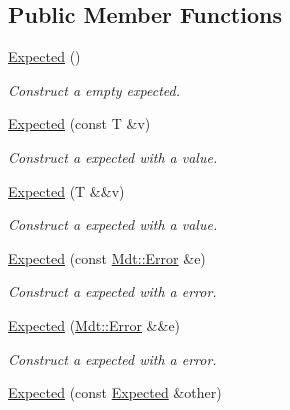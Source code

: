 \subsection*{Public Member Functions}
\begin{DoxyCompactItemize}
\item 
\hyperlink{class_mdt_1_1_expected_ab271cafc564b8dba7c5737a8e6f78a8d}{Expected} ()
\begin{DoxyCompactList}\small\item\em Construct a empty expected. \end{DoxyCompactList}\item 
\hyperlink{class_mdt_1_1_expected_a5046d26152b32d7184d756f00325cd60}{Expected} (const T \&v)\hypertarget{class_mdt_1_1_expected_a5046d26152b32d7184d756f00325cd60}{}\label{class_mdt_1_1_expected_a5046d26152b32d7184d756f00325cd60}

\begin{DoxyCompactList}\small\item\em Construct a expected with a value. \end{DoxyCompactList}\item 
\hyperlink{class_mdt_1_1_expected_abf1fd00a7d5508ab2030f729105de12f}{Expected} (T \&\&v)\hypertarget{class_mdt_1_1_expected_abf1fd00a7d5508ab2030f729105de12f}{}\label{class_mdt_1_1_expected_abf1fd00a7d5508ab2030f729105de12f}

\begin{DoxyCompactList}\small\item\em Construct a expected with a value. \end{DoxyCompactList}\item 
\hyperlink{class_mdt_1_1_expected_a98be29378d9ee4d855b041c5a347d967}{Expected} (const \hyperlink{class_mdt_1_1_error}{Mdt\+::\+Error} \&e)\hypertarget{class_mdt_1_1_expected_a98be29378d9ee4d855b041c5a347d967}{}\label{class_mdt_1_1_expected_a98be29378d9ee4d855b041c5a347d967}

\begin{DoxyCompactList}\small\item\em Construct a expected with a error. \end{DoxyCompactList}\item 
\hyperlink{class_mdt_1_1_expected_a63cf8d36dfb4657d39fcfb614f575ab4}{Expected} (\hyperlink{class_mdt_1_1_error}{Mdt\+::\+Error} \&\&e)\hypertarget{class_mdt_1_1_expected_a63cf8d36dfb4657d39fcfb614f575ab4}{}\label{class_mdt_1_1_expected_a63cf8d36dfb4657d39fcfb614f575ab4}

\begin{DoxyCompactList}\small\item\em Construct a expected with a error. \end{DoxyCompactList}\item 
\hyperlink{class_mdt_1_1_expected_a74ad44cec43f7cae5cd73388283818e3}{Expected} (const \hyperlink{class_mdt_1_1_expected}{Expected} \&other)\hypertarget{class_mdt_1_1_expected_a74ad44cec43f7cae5cd73388283818e3}{}\label{class_mdt_1_1_expected_a74ad44cec43f7cae5cd73388283818e3}


\end{DoxyCompactItemize}
